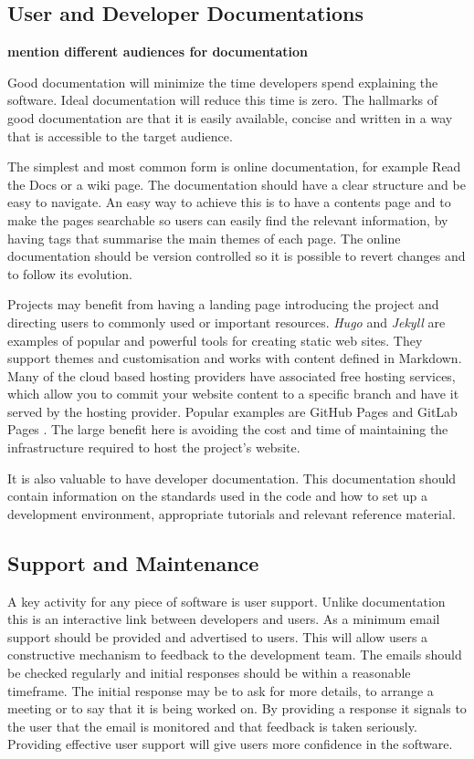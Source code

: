\documentclass[jnr]{iosart2x}
\newcommand{\todo}[1]{\textbf{#1}}
\begin{document}
\subsection{User and Developer Documentations}
\label{Documentation}

\todo{mention different audiences for documentation}

Good documentation will minimize the time developers spend explaining the software.
Ideal documentation will reduce this time is zero.
The hallmarks of good documentation are that it is easily available, concise and written in a way that is accessible to the target audience.

The simplest and most common form is online documentation, for example Read the Docs \cite{Read_The_Docs} or a wiki page.
The documentation should have a clear structure and be easy to navigate.
An easy way to achieve this is to have a contents page and to make the pages searchable so users can easily find the relevant information, by having tags that summarise the main themes of each page.
The online documentation should be version controlled so it is possible to revert changes and to follow its evolution.

Projects may benefit from having a landing page introducing the project and directing users to commonly used or important resources.
{\it Hugo} \cite{Hugo} and {\it Jekyll} \cite{Jekyll} are examples of popular and powerful tools for creating static web sites.
They support themes and customisation and works with content defined in Markdown.
Many of the cloud based hosting providers have associated free hosting services, which allow you to commit your website content to a specific branch and have it served by the hosting provider.
Popular examples are GitHub Pages \cite{GitHub_Pages} and GitLab Pages \cite{GitLab_Pages}.
The large benefit here is avoiding the cost and time of maintaining the infrastructure required to host the project's website.

It is also valuable to have developer documentation.
This documentation should contain information on the standards used in the code and how to set up a development environment, appropriate tutorials and relevant reference material.

\subsection{Support and Maintenance}
\label{Support and Maintenance}

A key activity for any piece of software is user support.
Unlike documentation this is an interactive link between developers and users.
As a minimum email support should be provided and advertised to users.
This will allow users a constructive mechanism to feedback to the development team.
The emails should be checked regularly and initial responses should be within a reasonable timeframe.
The initial response may be to ask for more details, to arrange a meeting or to say that it is being worked on.
By providing a response it signals to the user that the email is monitored and that feedback is taken seriously. 
Providing effective user support will give users more confidence in the software.
\end{document}
